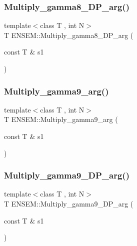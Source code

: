 \mbox{\label{namespaceENSEM_a583fae06358258391aea7892702ac919}} 
\subsubsection{\texorpdfstring{Multiply\_gamma8\_DP\_arg()}{Multiply\_gamma8\_DP\_arg()}}
{\footnotesize\ttfamily template$<$class T , int N$>$ \\
T E\+N\+S\+E\+M\+::\+Multiply\+\_\+gamma8\+\_\+\+D\+P\+\_\+arg (\begin{DoxyParamCaption}\item[{const T \&}]{s1 }\end{DoxyParamCaption})\hspace{0.3cm}{\ttfamily [inline]}}

\mbox{\label{namespaceENSEM_a9549bbaa92e4e60d143426d3a4cfe161}} 
\subsubsection{\texorpdfstring{Multiply\_gamma9\_arg()}{Multiply\_gamma9\_arg()}}
{\footnotesize\ttfamily template$<$class T , int N$>$ \\
T E\+N\+S\+E\+M\+::\+Multiply\+\_\+gamma9\+\_\+arg (\begin{DoxyParamCaption}\item[{const T \&}]{s1 }\end{DoxyParamCaption})\hspace{0.3cm}{\ttfamily [inline]}}

\mbox{\label{namespaceENSEM_a602908f02281a8e9841c857d21bf9e4b}} 
\subsubsection{\texorpdfstring{Multiply\_gamma9\_DP\_arg()}{Multiply\_gamma9\_DP\_arg()}}
{\footnotesize\ttfamily template$<$class T , int N$>$ \\
T E\+N\+S\+E\+M\+::\+Multiply\+\_\+gamma9\+\_\+\+D\+P\+\_\+arg (\begin{DoxyParamCaption}\item[{const T \&}]{s1 }\end{DoxyParamCaption})\hspace{0.3cm}{\ttfamily [inline]}}

